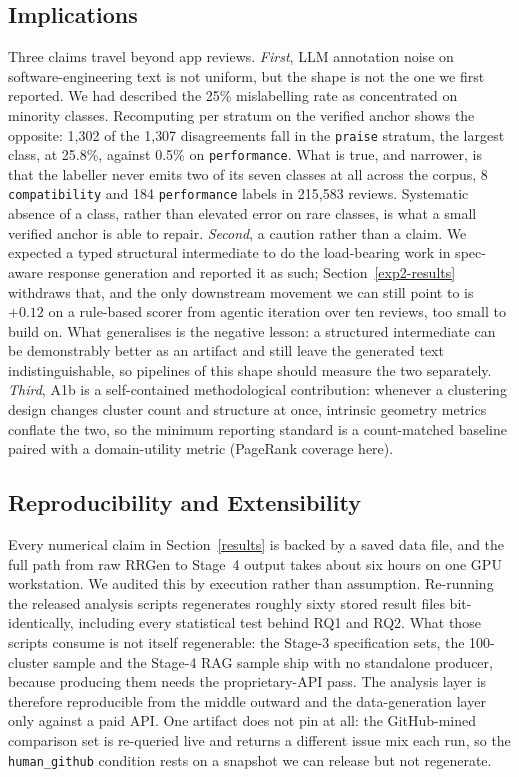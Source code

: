 \documentclass[preprint,12pt]{elsarticle}
\begin{document}
\subsection{Implications}
Three claims travel beyond app reviews. \emph{First}, LLM annotation noise on
  software-engineering text is not uniform, but the shape is not the one we first reported. We
  had described the 25\% mislabelling rate as concentrated on minority classes. Recomputing per
  stratum on the verified anchor shows the opposite: 1{,}302 of the 1{,}307 disagreements fall in
  the \texttt{praise} stratum, the largest class, at 25.8\%, against 0.5\% on
  \texttt{performance}. What is true, and narrower, is that the labeller never emits two of its
  seven classes at all across the corpus, 8 \texttt{compatibility} and 184 \texttt{performance}
  labels in 215{,}583 reviews. Systematic absence of a class, rather than elevated error on rare
  classes, is what a small verified anchor is able to repair. \emph{Second}, a caution rather than a claim. We expected a typed structural intermediate to do
  the load-bearing work in spec-aware response generation and reported it as such;
  Section~\ref{exp2-results} withdraws that, and the only downstream movement we can still point
  to is $+0.12$ on a rule-based scorer from agentic iteration over ten reviews, too small to build
  on. What generalises is the negative lesson: a structured intermediate can be demonstrably
  better as an artifact and still leave the generated text indistinguishable, so pipelines of this
  shape should measure the two separately. \emph{Third}, A1b is a self-contained methodological contribution: whenever a clustering design
  changes cluster count and structure at once, intrinsic geometry metrics conflate the two, so the
  minimum reporting standard is a count-matched baseline paired with a domain-utility metric
  (PageRank coverage here).

\subsection{Reproducibility and Extensibility}\label{reproducibility}
Every numerical claim in Section~\ref{results} is backed by a saved data file, and the full path
from raw RRGen to Stage~4 output takes about six hours on one GPU workstation. We audited this by
execution rather than assumption. Re-running the released analysis scripts regenerates roughly
sixty stored result files bit-identically, including every statistical test behind RQ1 and RQ2.
What those scripts consume is not itself regenerable: the Stage-3 specification sets, the
100-cluster sample and the Stage-4 RAG sample ship with no standalone producer, because producing
them needs the proprietary-API pass. The analysis layer is therefore reproducible from the middle outward and the data-generation
layer only against a paid API. One artifact does not pin at all: the GitHub-mined comparison set
is re-queried live and returns a different issue mix each run, so the \texttt{human\_github}
condition rests on a snapshot we can release but not regenerate.
\end{document}
